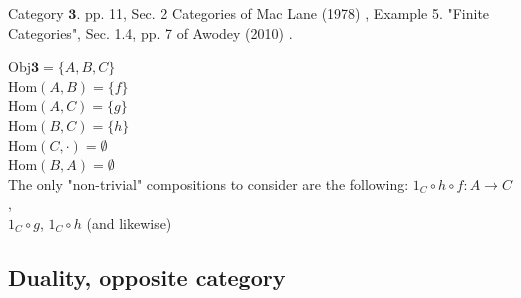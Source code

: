 Category $\mathbf{3}$. pp. 11, Sec. 2 Categories of Mac Lane (1978) \cite{agat:MacL1978}, Example 5. "Finite Categories", Sec. 1.4, pp. 7 of Awodey (2010) \cite{agat:Awod2010}. 

$\text{Obj}{\mathbf{3}} = \lbrace A, B, C \rbrace$ \\
$\text{Hom}{(A, B)} = \lbrace f \rbrace$ \\
$\text{Hom}{(A, C)} = \lbrace g \rbrace$ \\
$\text{Hom}{(B, C)} = \lbrace h \rbrace$ \\
$\text{Hom}{(C, \cdot)} = \emptyset $ \\
$\text{Hom}{(B, A)} = \emptyset$ \\

The only "non-trivial" compositions to consider are the following:
$1_C \circ h \circ f : A \to C$, \\
$1_C \circ g$, $1_C \circ h$ (and likewise) \\


\subsection{Duality, opposite category}

